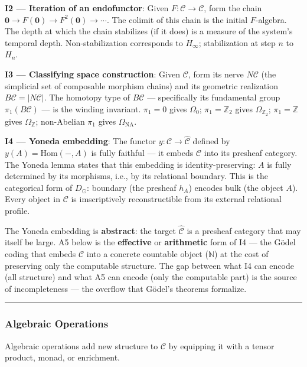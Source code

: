 \documentclass[12pt,a4paper]{article}
\begin{document}
\textbf{I2 --- Iteration of an endofunctor}: Given $F: \mathcal{C} \to \mathcal{C}$, form the chain $\mathbf{0} \to F(\mathbf{0}) \to F^2(\mathbf{0}) \to \cdots$. The colimit of this chain is the initial $F$-algebra. The depth at which the chain stabilizes (if it does) is a measure of the system's temporal depth. Non-stabilization corresponds to $H_{\infty}$; stabilization at step $n$ to $H_n$.

\textbf{I3 --- Classifying space construction}: Given $\mathcal{C}$, form its nerve $N\mathcal{C}$ (the simplicial set of composable morphism chains) and its geometric realization $B\mathcal{C} = |N\mathcal{C}|$. The homotopy type of $B\mathcal{C}$ --- specifically its fundamental group $\pi_1(B\mathcal{C})$ --- is the winding invariant. $\pi_1 = 0$ gives $\Omega_0$; $\pi_1 = \mathbb{Z}_2$ gives $\Omega_{\mathbb{Z}_2}$; $\pi_1 = \mathbb{Z}$ gives $\Omega_\mathbb{Z}$; non-Abelian $\pi_1$ gives $\Omega_\text{NA}$.

\textbf{I4 --- Yoneda embedding}: The functor $y: \mathcal{C} \to \hat{\mathcal{C}}$ defined by $y(A) = \text{Hom}(-,A)$ is fully faithful --- it embeds $\mathcal{C}$ into its presheaf category. The Yoneda lemma states that this embedding is identity-preserving: $A$ is fully determined by its morphisms, i.e., by its relational boundary. This is the categorical form of $D_{\odot}$: boundary (the presheaf $h_A$) encodes bulk (the object $A$). Every object in $\mathcal{C}$ is imscriptively reconstructible from its external relational profile.

The Yoneda embedding is \textbf{abstract}: the target $\hat{\mathcal{C}}$ is a presheaf category that may itself be large. A5 below is the \textbf{effective} or \textbf{arithmetic} form of I4 --- the G\"odel coding that embeds $\mathcal{C}$ into a concrete countable object ($\mathbb{N}$) at the cost of preserving only the computable structure. The gap between what I4 can encode (all structure) and what A5 can encode (only the computable part) is the source of incompleteness --- the overflow that G\"odel's theorems formalize.

\begin{center}
\rule{0.5\textwidth}{0.4pt}
\end{center}

\subsubsection{Algebraic Operations}

Algebraic operations add new structure to $\mathcal{C}$ by equipping it with a tensor product, monad, or enrichment.
\end{document}
